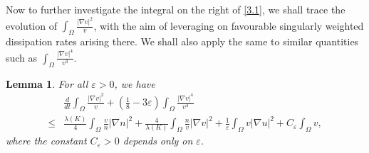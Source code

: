 \documentclass[12pt]{article}
\theoremstyle{plain}
\newtheorem{lemma}{Lemma}[section]
\theoremstyle{definition}
\numberwithin{equation}{section}
\begin{document}
Now to further investigate the integral on the right of \eqref{3.1}, we shall trace the evolution of
$\int_\Omega  \frac{|\nabla v|^2}v$, with the aim
of leveraging on favourable singularly weighted dissipation rates arising there. We shall also apply the same to similar quantities such as $\int_\Omega \frac {|\nabla v|^4}{v^3}$.
 \begin{lemma}\label{lemma3.2}
 For all $\varepsilon>0$, we have
 \begin{equation}\label{3.3}
\begin{split}
&\frac d{dt} \int_\Omega  \frac{|\nabla v|^2}v
+(\frac18-3\varepsilon)\int_\Omega \frac{|\nabla v|^4}{v^3}\\
\leq &
\frac{\lambda(K)} 4\int_\Omega\frac{v}{n}|\nabla n|^2
+
\frac4{\lambda(K)} \int_\Omega\frac nv |\nabla v|^2 +\frac1{\varepsilon}
\int_\Omega v |\nabla u|^2+C_\varepsilon\int_{\Omega}v,
\end{split}
\end{equation}
where the constant $C_{\varepsilon}>0$ depends only on $\varepsilon$.
\end{lemma}
\end{document}
